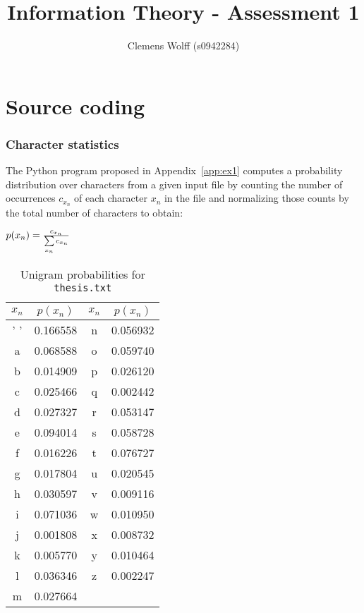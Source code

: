 \documentclass[10pt,a4paper,twoside,onecolumn]{article}
\title{Information Theory - Assessment 1}
\author{Clemens Wolff (s0942284)}
\date{\vspace{-2em}}
\newcommand*{\thesisTXT}{{\tt thesis.txt}\xspace}
\begin{document}
\maketitle


\part{Source coding}

\section{Character statistics}\label{sec:ex1}

The Python program proposed in Appendix~\ref{app:ex1} computes a probability
distribution over characters from a given input file by counting the number of
occurrences $c_{x_n}$ of each character $x_n$ in the file and normalizing those
counts by the total number of characters to obtain:

\begin{center}
    $p(x_n) = {c_{x_n} \over\sum\limits_{x_n} c_{x_n}}$
\end{center}

\begin{table}[ht]
\centering
\begin{tabular}{| c c | c c |}
\hline
$x_n$ & $p(x_n)$ & $x_n$ & $p(x_n)$ \\
\hline
 ' '  & 0.166558 &   n   & 0.056932 \\
  a   & 0.068588 &   o   & 0.059740 \\
  b   & 0.014909 &   p   & 0.026120 \\
  c   & 0.025466 &   q   & 0.002442 \\
  d   & 0.027327 &   r   & 0.053147 \\
  e   & 0.094014 &   s   & 0.058728 \\
  f   & 0.016226 &   t   & 0.076727 \\
  g   & 0.017804 &   u   & 0.020545 \\
  h   & 0.030597 &   v   & 0.009116 \\
  i   & 0.071036 &   w   & 0.010950 \\
  j   & 0.001808 &   x   & 0.008732 \\
  k   & 0.005770 &   y   & 0.010464 \\
  l   & 0.036346 &   z   & 0.002247 \\
  m   & 0.027664 &       &          \\
\hline
\end{tabular}
\caption{Unigram probabilities for \thesisTXT}
\label{tbl:unigram-probs}
\end{table}
\end{document}
